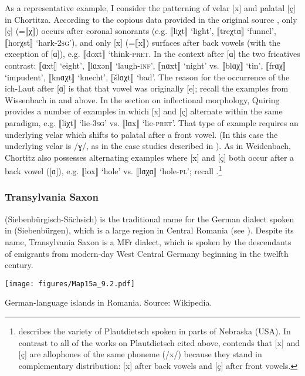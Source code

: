 As a representative example, I consider the patterning of velar [x] and palatal [ç] in Chortitza.  According to the copious data provided in the original source \citep{Quiring1928}, only [ç] (=⟦χ⟧) occurs after coronal sonorants (e.g. ⟦liχt⟧ ‘light', ⟦treχtɑ⟧ ‘funnel’, ⟦horχst⟧ ‘hark-\textsc{2sg}'), and  only [x] (=⟦x⟧) surfaces after back vowels (with the exception of [ɑ]), e.g. ⟦doxt⟧ ‘think-\textsc{pret}. In the context after [ɑ] the two fricatives contrast: ⟦ɑxt⟧ ‘eight', ⟦lɑxən⟧ ‘laugh-\textsc{inf}’, ⟦nɑxt⟧ ‘night' vs. ⟦blɑχ⟧ ‘tin’, ⟦frɑχ⟧ ‘impudent’, ⟦knɑχt⟧ ‘knecht’, ⟦šlɑχt⟧ ‘bad’. The reason for the occurrence of the ich-Laut after [ɑ] is that that vowel was originally [e]; recall the examples from Wissenbach in  and  above. In the section on inflectional morphology, Quiring provides a number of examples in which [x] and [ç] alternate within the same paradigm, e.g. ⟦liχt⟧ ‘lie-\textsc{3sg}’ vs. ⟦lɑx⟧ ‘lie-\textsc{pret}’. That type of example requires an underlying velar which shifts to palatal after a front vowel. (In this case the underlying velar is /ɣ/, as in the case studies described in ). As in  Weidenbach, Chortitz also possesses alternating examples where [x] and [ç] both occur after a back vowel ([ɑ]), e.g. ⟦lox⟧ ‘hole’ vs. ⟦lɑχɑ⟧ ‘hole-\textsc{pl}'; recall .{\footnote{\citet{Buchheit1978} describes the variety of Plautdietsch spoken in parts of Nebraska (USA). In contrast to all of the works on Plautdietsch cited above, \citet[73]{Buchheit1978} contends that [x] and [ç] are allophones of the same phoneme (/x/) because they stand in complementary distribution: [x] after back vowels and [ç] after front vowels.}}

\subsubsection{Transylvania Saxon}\largerpage{}

 (Siebenbürgisch-Sächsich) is the traditional name for the German dialect spoken in  (Siebenbürgen), which is a large region in Central Romania (see ). Despite its name, Transylvania Saxon is a MFr dialect, which is spoken by the descendants of emigrants from modern-day West Central Germany beginning in the twelfth century.\pagebreak

\begin{map}
\texttt{[image: figures/Map15a\_9.2.pdf]}
\caption[German-language islands in Romania.]{German-language islands in Romania. Source: Wikipedia.\label{map:9.2}}
\end{map}

